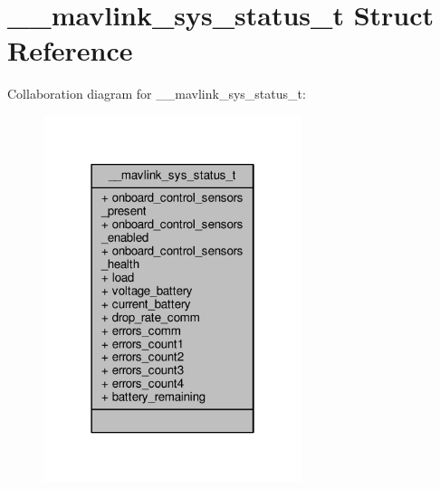 \hypertarget{struct____mavlink__sys__status__t}{\section{\+\_\+\+\_\+mavlink\+\_\+sys\+\_\+status\+\_\+t Struct Reference}
\label{struct____mavlink__sys__status__t}
}


Collaboration diagram for \+\_\+\+\_\+mavlink\+\_\+sys\+\_\+status\+\_\+t\+:
\nopagebreak
\begin{figure}[H]
\begin{center}
\leavevmode
\includegraphics[width=214pt]{struct____mavlink__sys__status__t__coll__graph}
\end{center}
\end{figure}
